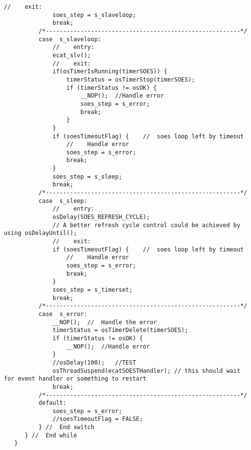 \begin{lstlisting}[label=lst:soesAPP DSM,caption={Source code for SOES APP DSM}]
              //	exit:
              soes_step = s_slaveloop;
              break;
          /*--------------------------------------------------------*/
          case  s_slaveloop:
              //	entry:
              ecat_slv();
              //	exit:
              if(osTimerIsRunning(timerSOES)) {
                  timerStatus = osTimerStop(timerSOES);
                  if (timerStatus != osOK) {
                      __NOP();	//Handle error
                      soes_step = s_error;
                      break;
                  }
              }
              if (soesTimeoutFlag) {	//	soes loop left by timeout
                  //	Handle error
                  soes_step = s_error;
                  break;
              }
              soes_step = s_sleep;
              break;
          /*--------------------------------------------------------*/
          case  s_sleep:
              //	entry:
              osDelay(SOES_REFRESH_CYCLE);
              // A better refresh cycle control could be achieved by using osDelayUntil();
              //	exit:
              if (soesTimeoutFlag) {	//	soes loop left by timeout
                  //	Handle error
                  soes_step = s_error;
                  break;
              }
              soes_step = s_timerset;
              break;
          /*--------------------------------------------------------*/
          case  s_error:
              __NOP();	//	Handle the error
              timerStatus = osTimerDelete(timerSOES);
              if (timerStatus != osOK) {
                  __NOP();	//Handle error
              }
              //osDelay(100);	//TEST
              osThreadSuspend(ecatSOESTHandler); // this should wait for event handler or something to restart
              break;
          /*--------------------------------------------------------*/
          default:
              soes_step = s_error;
              //soesTimeoutFlag = FALSE;
          }	//	End switch
      }	//	End while
   }
    \end{lstlisting}
